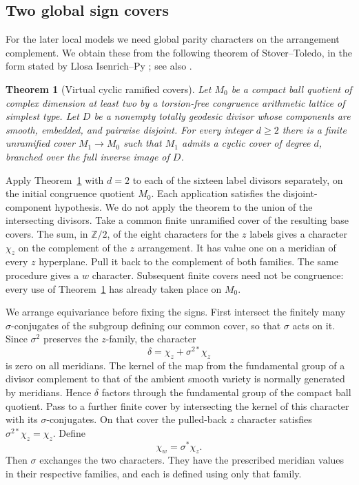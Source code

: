 \documentclass[11pt,reqno]{amsart}
\numberwithin{equation}{section}
\newtheorem{theorem}{Theorem}[section]
\theoremstyle{definition}
\theoremstyle{remark}
\newcommand{\Z}{\mathbb Z}
\begin{document}
\subsection{Two global sign covers}\label{geo:signs}

For the later local models we need global parity characters on the
arrangement complement.  We obtain these from the following theorem
of Stover--Toledo, in the form stated by Llosa Isenrich--Py
\cite[Theorem~4.2]{LlosaPy}; see also \cite{StoverToledo}.

\begin{theorem}[Virtual cyclic ramified covers]\label{geo:stover-toledo}
Let $M_0$ be a compact ball quotient of complex dimension at least two
by a torsion-free congruence arithmetic lattice of simplest type.  Let
$D$ be a nonempty totally geodesic divisor whose components are smooth,
embedded, and pairwise disjoint.  For every integer $d\ge2$ there is a
finite unramified cover $M_1\to M_0$ such that $M_1$ admits a cyclic
cover of degree $d$, branched over the full inverse image of $D$.
\end{theorem}

Apply Theorem~\ref{geo:stover-toledo} with $d=2$ to each of the sixteen
label divisors separately, on the initial congruence quotient $M_0$.
Each application satisfies the disjoint-component hypothesis.  We do
not apply the theorem to the union of the intersecting divisors.  Take
a common finite unramified cover of the resulting base covers.  The
sum, in $\Z/2$, of the eight characters for the $z$ labels gives a
character $\chi_z$ on the complement of the $z$ arrangement.  It has
value one on a meridian of every $z$ hyperplane.  Pull it back to the
complement of both families.  The same procedure gives a $w$ character.
Subsequent finite covers need not be congruence: every use of
Theorem~\ref{geo:stover-toledo} has already taken place on $M_0$.

We arrange equivariance before fixing the signs.  First intersect the
finitely many $\sigma$-conjugates of the subgroup defining our common
cover, so that $\sigma$ acts on it.  Since $\sigma^2$ preserves the
$z$-family, the character
\[
                 \delta=\chi_z+\sigma^{2*}\chi_z
\]
is zero on all meridians.  The kernel of the map from the fundamental
group of a divisor complement to that of the ambient smooth variety
is normally generated by meridians.  Hence $\delta$ factors through
the fundamental group of the compact ball quotient.  Pass to a further
finite cover by intersecting the kernel of this character with its
$\sigma$-conjugates.  On that cover the pulled-back $z$ character
satisfies $\sigma^{2*}\chi_z=\chi_z$.  Define
\begin{equation}\label{geo:sign-equivariance}
                  \chi_w=\sigma^*\chi_z.
\end{equation}
Then $\sigma$ exchanges the two characters.  They have the prescribed
meridian values in their respective families, and each is defined
using only that family.
\end{document}
